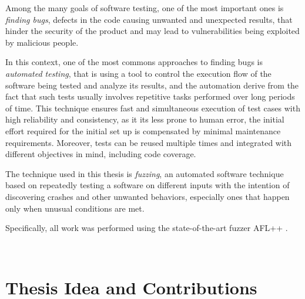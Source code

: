 Among the many goals of software testing, one of the most important ones is \textit{finding bugs}, defects in the code causing unwanted and unexpected results, that hinder the security of the product and may lead to vulnerabilities being exploited by malicious people.


In this context, one of the most commons approaches to finding bugs is \textit{automated testing}, that is using a tool to control the execution flow of the software being tested and analyze its results, and the automation derive from the fact that such tests usually involves repetitive tasks performed over long periods of time. This technique ensures fast and simultaneous execution of test cases with high reliability and consistency, as it its less prone to human error, the initial effort required for the initial set up is compensated by minimal maintenance requirements. Moreover, tests can be reused multiple times and integrated with different objectives in mind, including code coverage.

The technique used in this thesis is \textit{fuzzing}, an automated software technique based on repeatedly testing a software on different inputs with the intention of discovering crashes and other unwanted behaviors, especially ones that happen only when unusual conditions are met.

Specifically, all work was performed using the state-of-the-art fuzzer AFL++ \cite{AFL}.



\ \\
\section{Thesis Idea and Contributions}


